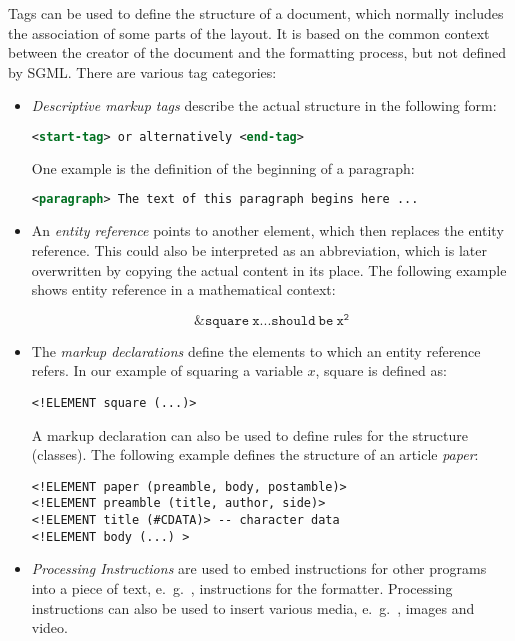 Tags can be used to define the structure of a document, which normally includes the association of some parts of the layout. It is based on the common context between the creator of the document and the formatting process, but not defined by SGML. There are various tag categories:

\begin{itemize}
	\item \textit{Descriptive markup tags} describe the actual structure in the following form:
	
\begin{lstlisting}[language=xml, frame=single]
<start-tag> or alternatively <end-tag>
\end{lstlisting}

One example is the definition of the beginning of a paragraph:
\begin{lstlisting}[language=xml, frame=single]
<paragraph> The text of this paragraph begins here ...
\end{lstlisting}

\item An \textit{entity reference} points to another element, which then replaces the entity reference. This could also be interpreted as an abbreviation, which is later overwritten by copying the actual content in its place. The following example shows entity reference in a mathematical context:

\[\mathtt{\&square \: x ... should\: be\: x^2}\]




\item The \textit{markup declarations} define the elements to which an entity reference refers. In our example of squaring a variable $ x $, square is defined as:
\begin{lstlisting}[frame=single]
	<!ELEMENT square (...)>
\end{lstlisting}

A markup declaration can also be used to define rules for the structure (classes). The following example defines the structure of an article \textit{paper}:
	
\begin{lstlisting}[frame=single]
<!ELEMENT paper (preamble, body, postamble)>
<!ELEMENT preamble (title, author, side)>
<!ELEMENT title (#CDATA)> -- character data
<!ELEMENT body (...) >
\end{lstlisting}

\item \textit{Processing Instructions} are used to embed instructions for other programs into a piece of text, e.\ g.\ , instructions for the formatter. Processing instructions can also be used to insert various media, e.\ g.\ , images and video.
\end{itemize}

